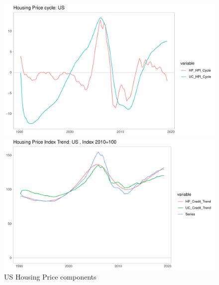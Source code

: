 \documentclass[fleqn]{article}
\begin{document}
\begin{outline}[enumerate]
\begin{figure}[h!]
	\caption{US Housing Price components}	
	\centerline{\includegraphics[scale=0.7]{../../VAR_2_notrendcovar/Output/Graphs/HP_cycle_US.pdf}}
	\centerline{\includegraphics[scale=0.7]{../../VAR_2_notrendcovar/Output/Graphs/HP_trend_US.pdf}}
\end{figure}


\end{outline}
\end{document}

